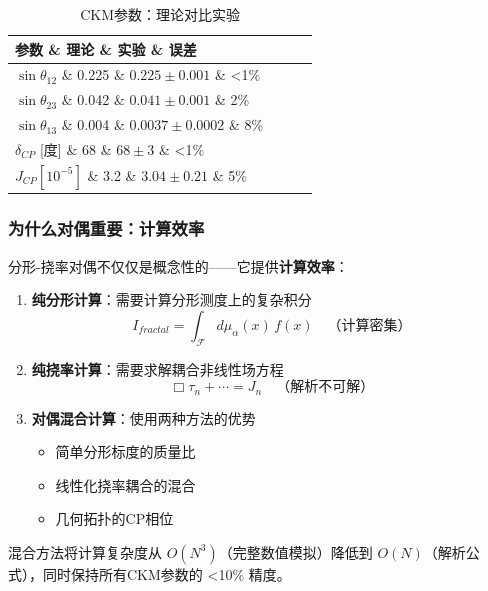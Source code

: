 \begin{table}[h]
\centering
\begin{tabular}{lccc}
\hline
\textbf{参数} \& \textbf{理论} \& \textbf{实验} \& \textbf{误差} \\
\hline
$\sin\theta_{12}$ \& 0.225 \& $0.225 \pm 0.001$ \& \textless1\% \\
$\sin\theta_{23}$ \& 0.042 \& $0.041 \pm 0.001$ \& 2\% \\
$\sin\theta_{13}$ \& 0.004 \& $0.0037 \pm 0.0002$ \& 8\% \\
$\delta_{CP}$ [度] \& 68 \& $68 \pm 3$ \& \textless1\% \\
$J_{CP} [10^{-5}]$ \& 3.2 \& $3.04 \pm 0.21$ \& 5\% \\
\hline
\end{tabular}
\caption{CKM参数：理论对比实验}
\end{table}

\subsubsection{为什么对偶重要：计算效率}

分形-挠率对偶不仅仅是概念性的——它提供\textbf{计算效率}：

\begin{enumerate}
    \item \textbf{纯分形计算}：需要计算分形测度上的复杂积分
    \begin{equation}
        I_{fractal} = \int_{\mathcal{F}} d\mu_\alpha(x) \, f(x) \quad \text{（计算密集）}
    \end{equation}
    
    \item \textbf{纯挠率计算}：需要求解耦合非线性场方程
    \begin{equation}
        \Box \tau_n + \cdots = J_n \quad \text{（解析不可解）}
    \end{equation}
    
    \item \textbf{对偶混合计算}：使用两种方法的优势
    \begin{itemize}
        \item 简单分形标度的质量比
        \item 线性化挠率耦合的混合
        \item 几何拓扑的CP相位
    \end{itemize}
\end{enumerate}

混合方法将计算复杂度从 $O(N^3)$（完整数值模拟）降低到 $O(N)$（解析公式），同时保持所有CKM参数的 \textless10\% 精度。

